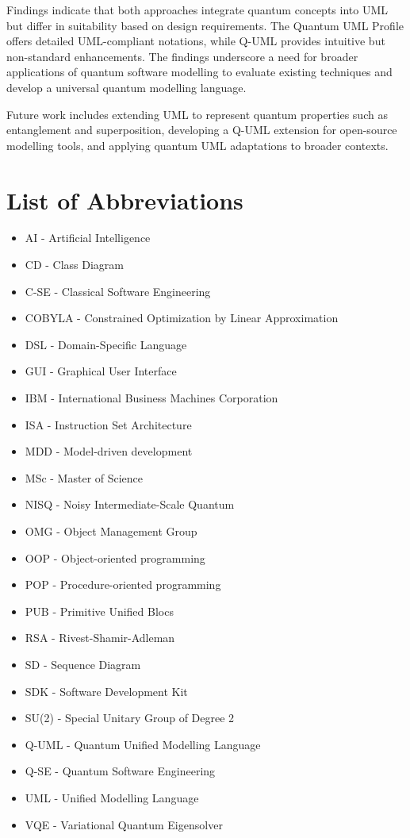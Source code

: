\documentclass{article}
\begin{document}
Findings indicate that both approaches integrate quantum concepts into UML but differ in suitability based on design requirements. The Quantum UML Profile offers detailed UML-compliant notations, while Q-UML provides intuitive but non-standard enhancements. The findings underscore a need for broader applications of quantum software modelling to evaluate existing techniques and develop a universal quantum modelling language.

Future work includes extending UML to represent quantum properties such as entanglement and superposition, developing a Q-UML extension for open-source modelling tools, and applying quantum UML adaptations to broader contexts. 

\newpage

\listoffigures
\newpage

\section*{List of Abbreviations}
\begin{itemize}
    \item AI - Artificial Intelligence
    \item CD - Class Diagram
    \item C-SE - Classical Software Engineering
    \item COBYLA - Constrained Optimization by Linear Approximation
    \item DSL - Domain-Specific Language
    \item GUI - Graphical User Interface
    \item IBM - International Business Machines Corporation
    \item ISA - Instruction Set Architecture
    \item MDD - Model-driven development
    \item MSc - Master of Science
    \item NISQ - Noisy Intermediate-Scale Quantum
    \item OMG - Object Management Group
    \item OOP - Object-oriented programming
    \item POP - Procedure-oriented programming
    \item PUB - Primitive Unified Blocs
    \item RSA - Rivest-Shamir-Adleman
    \item SD - Sequence Diagram
    \item SDK - Software Development Kit
    \item SU(2) - Special Unitary Group of Degree 2
    \item Q-UML - Quantum Unified Modelling Language
    \item Q-SE - Quantum Software Engineering
    \item UML - Unified Modelling Language
    \item VQE - Variational Quantum Eigensolver
\end{itemize}
\newpage
\end{document}
